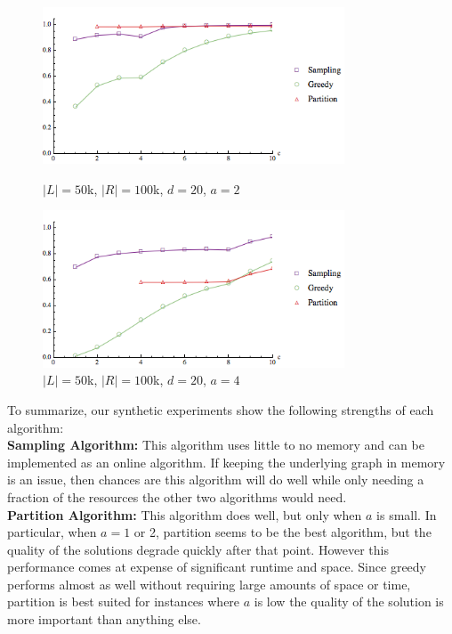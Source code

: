 \begin{figure}[t]
\centering
\begin{minipage}[h]{0.48\textwidth}
\centering
\includegraphics[width=0.8\textwidth]{images/l=50000,r=100000,a=2_Greedy_vs_Naive.png}
\caption{$|L|=50$k, $|R|=100$k, $d=20$, $a=2$}\label{fig:a=2}
\end{minipage}
\hspace{0cm}
\begin{minipage}[h]{0.48\textwidth}
\centering
\includegraphics[width=0.8\textwidth]{images/l=50000,r=100000,a=4_Greedy_vs_Naive.png}
\caption{$|L|=50$k, $|R|=100$k, $d=20$, $a=4$}\label{fig:a=4}
\end{minipage}
\vspace{-0.2in}
\end{figure}

\vs
To summarize, our synthetic experiments show the following strengths of each algorithm:\\

\textbf{Sampling Algorithm:} This algorithm uses little to no memory and can
be implemented as an online algorithm. If keeping the underlying graph in
memory is an issue, then chances are this algorithm will do well while only needing
a fraction of the resources the other two algorithms would need.\\

\textbf{Partition Algorithm:} This algorithm does well, but only when $a$ is small.
In particular, when $a=1$ or 2, partition seems to be the best algorithm, but the quality
of the solutions degrade quickly after that point. However this performance comes at
expense of significant runtime and space. Since greedy performs almost as well without
requiring large amounts of space or time, partition is best suited for instances where
$a$ is low the quality of the solution is more important than anything else.\\

